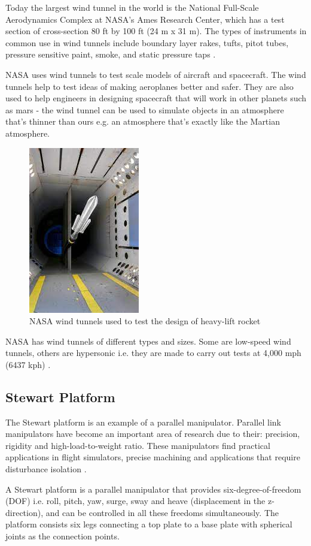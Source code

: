 Today the largest wind tunnel in the world is the National Full-Scale Aerodynamics Complex at NASA's Ames Research Center, which has a test section of cross-section 80 ft by 100 ft (24 m x 31 m). The types of instruments in common use in wind tunnels include boundary layer rakes, tufts, pitot tubes, pressure sensitive paint, smoke, and static pressure taps \cite{morris_force_2010}.

NASA uses wind tunnels to test scale models of aircraft and spacecraft. The wind tunnels help to test ideas of making aeroplanes better and safer. They are also used to help engineers in designing spacecraft that will work in other planets such as mars - the wind tunnel can be used to simulate objects in an atmosphere that's thinner than ours e.g. an atmosphere that's exactly like the Martian atmosphere.
\begin{center}
	\begin{figure}[H]
		\centering
		\includegraphics[width=0.25\linewidth]{Figures/Fig4.JPG}
		\caption[NASA Wind tunnel - space application]{NASA wind tunnels used to test the design of heavy-lift rocket \cite{NASA}}
	\end{figure}
\end{center}
NASA has wind tunnels of different types and sizes. Some are low-speed wind tunnels, others are hypersonic i.e. they are made to carry out tests at 4,000 mph (6437 kph) \cite{NASA}.
\subsection{Stewart Platform}
The Stewart platform is an example of a parallel manipulator.
Parallel link manipulators have become an important area of research due to their: precision, rigidity and high-load-to-weight ratio.
These manipulators find practical applications in flight simulators, precise machining and applications that require disturbance isolation \cite{iqbal_dynamic_2008}.

A Stewart platform is a parallel manipulator that provides six-degree-of-freedom (DOF) i.e. roll, pitch, yaw, surge, sway and heave (displacement in the z-direction), and can be controlled in all these freedoms simultaneously.
The platform consists six legs connecting a top plate to a base plate with spherical joints as the connection points.

